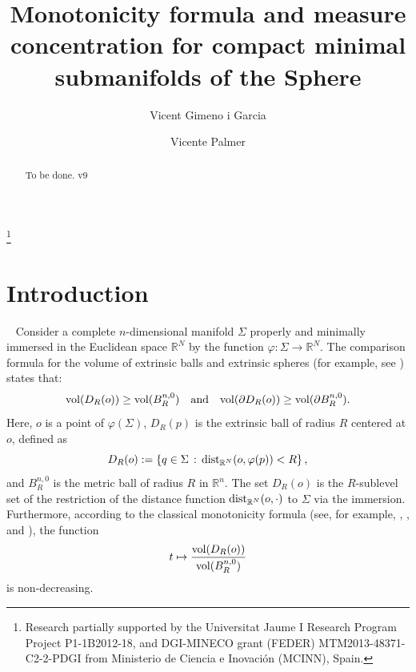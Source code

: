 \documentclass{amsart}
\theoremstyle{definition}
\theoremstyle{remark}
\begin{document}
\title[Measure Concentration]{Monotonicity formula and measure concentration for compact minimal submanifolds of the Sphere}





\author{Vicent Gimeno i Garcia}
\address{Department of Mathematics, Universitat Jaume I-IMAC,   E-12071, 
Castell\'{o}, Spain}
\author{Vicente Palmer}
\address{Department of Mathematics, Universitat Jaume I-INIT,   E-12071, 
Castell\'{o}, Spain}

\thanks{Research partially supported by  the Universitat Jaume I Research Program Project P1-1B2012-18, and DGI-MINECO grant (FEDER) MTM2013-48371-C2-2-PDGI from Ministerio de Ciencia e Inovaci\'{o}n (MCINN), Spain.}





\dedicatory{}



\begin{abstract}
To be done. v9\end{abstract}

\maketitle

\section{Introduction}\label{sec:intro}\
Consider a complete $n$-dimensional manifold $\Sigma$ properly and minimally immersed in the Euclidean space $\mathbb{R}^N$ by the function $\varphi:\Sigma\to \mathbb{R}^N$. The comparison formula for the volume of extrinsic balls and extrinsic spheres (for example, see \cite{CLY1984}) states that:
$$
{\rm vol}(D_R(o))\geq {\rm vol}(B_R^{n,0})\quad {\rm and}\quad {\rm vol}(\partial D_R(o))\geq {\rm vol}(\partial B_R^{n,0}).
$$
Here, $o$ is a point of $\varphi(\Sigma)$, $D_R(p)$ is the extrinsic ball of radius $R$ centered at $o$, defined as
$$
D_R(o):=\left\lbrace q\in \Sigma\, :\, {\rm dist}_{\mathbb{R}^N}(o, \varphi(p))<R\right\rbrace,
$$
and $B_R^{n,0}$ is the metric ball of radius $R$ in $\mathbb{R}^n$. The set $D_R(o)$ is the $R$-sublevel set of the restriction of the distance function ${\rm dist}_{\mathbb{R}^N}(o,\cdot)$ to $\Sigma$ via the immersion.
Furthermore, according to the classical monotonicity formula (see, for example, \cite{Simon}, \cite{Meeks2011325}, and \cite{Tkachev1994313}), the function
$$
t\mapsto \frac{{\rm vol}(D_R(o))}{{\rm vol}(B_R^{n,0})}
$$
is non-decreasing.
\end{document}
